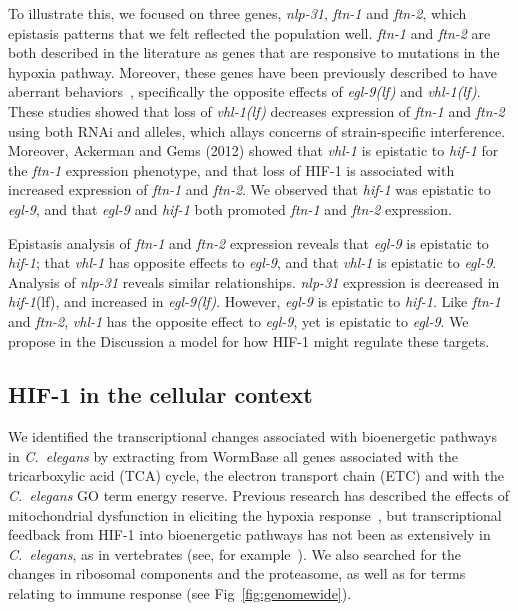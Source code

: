 \documentclass[9pt,twocolumn,twoside]{pnas-new}
\newcommand{\cel}{\emph{C.~elegans}}
\newcommand{\gene}[1]{\emph{#1}}
\newcommand{\nlp}{\emph{\mbox{nlp-31}}}
\newcommand{\ftna}{\emph{\mbox{ftn-1}}}
\newcommand{\ftnb}{\emph{\mbox{ftn-2}}}
\newcommand{\egl}{\emph{\mbox{egl-9}(lf)}}
\newcommand{\vhl}{\emph{\mbox{vhl-1}(lf)}}
\newcommand{\hif}{\emph{\mbox{hif-1}}(lf)}
\newcommand{\hifp}{HIF-1}
\begin{document}
To illustrate this, we focused on three genes, \nlp{}, \ftna{} and \ftnb{}, which
epistasis patterns that we felt reflected the population well. \ftna{} and \ftnb{}
are both described in the literature as genes that are responsive to mutations in
the hypoxia pathway. Moreover, these genes have been previously described to have
aberrant behaviors~\cite{Ackerman2012,Romney2011}, specifically the
opposite effects of \egl{} and \vhl{}. These studies showed that loss of \vhl{}
decreases expression of \ftna{} and \ftnb{} using both RNAi and alleles, which
allays concerns of strain-specific interference. Moreover, Ackerman and Gems
(2012) showed that \gene{vhl-1} is epistatic to \gene{hif-1} for the \ftna{}
expression phenotype, and that loss of
\hifp{} is associated with increased expression of \ftna{} and \ftnb{}. We observed
that \gene{hif-1} was epistatic to \gene{egl-9}, and that \gene{egl-9} and
\gene{hif-1} both promoted \ftna{} and \ftnb{} expression.

Epistasis analysis of \ftna{} and \ftnb{} expression reveals that \gene{egl-9} is
epistatic to \gene{hif-1}; that \gene{vhl-1} has opposite effects to \gene{egl-9},
and that \gene{vhl-1} is epistatic to \gene{egl-9}. Analysis of \nlp{}
reveals similar relationships. \nlp{} expression is decreased in \hif{},
and increased in \egl{}. However, \gene{egl-9} is epistatic to \gene{hif-1}.
Like \ftna{} and \ftnb{}, \gene{vhl-1} has the opposite effect to \gene{egl-9},
yet is epistatic to \gene{egl-9}. We propose in the Discussion a model for how
\hifp{} might regulate these targets.


\subsection*{\hifp{} in the cellular context}
\label{sub:metabolism}

We identified the transcriptional changes
associated with bioenergetic pathways in \cel{} by extracting from
WormBase all genes associated with the tricarboxylic acid (TCA) cycle, the
electron transport chain (ETC) and with the \cel{} GO term energy reserve.
Previous research has described the effects of mitochondrial dysfunction in
eliciting the hypoxia response~\cite{Lee2010}, but transcriptional feedback
from \hifp{} into bioenergetic pathways has not been as extensively in \cel{},
as in vertebrates (see, for example~\cite{Semenza1994,Semenza2012}).
We also searched for the changes in ribosomal components and the proteasome, as
well as for terms relating to immune response (see Fig~\ref{fig:genomewide}).
\end{document}
